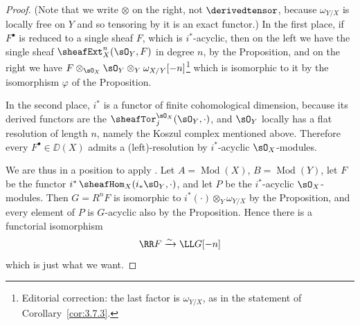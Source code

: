 \begin{proof}
(Note that we write $\otimes$ on the right, not $\derivedtensor$, because $\omega_{Y/X}$ is locally free on $Y$ and so tensoring by it is an exact functor.) In the first place, if $F^\bullet$ is reduced to a single sheaf $F$, which is $i^*$-acyclic, then on the left we have the single sheaf $\sheafExt_X^n(\sO_Y,F)$ in degree $n$, by the Proposition, and on the right we have $F\otimes_{\sO_X}\sO_Y\otimes_Y\omega_{X/Y}[-n]$\footnote{Editorial correction: the last factor is $\omega_{Y/X}$, as in the statement of Corollary~\ref{cor:3.7.3}.} which is isomorphic to it by the isomorphism $\varphi$ of the Proposition.

In the second place, $i^*$ is a functor of finite cohomological dimension, because its derived functors are the $\sheafTor_j^{\sO_X}(\sO_Y,\cdot)$, and $\sO_Y$ locally has a flat resolution of length $n$, namely the Koszul complex mentioned above. Therefore every $F^\bullet\in\DD(X)$ admits a (left)-resolution by $i^*$-acyclic $\sO_X$-modules.

We are thus in a position to apply . Let $A=\operatorname{Mod}(X)$, $B=\operatorname{Mod}(Y)$, let $F$ be the functor $i^*\,\sheafHom_X(i_*\sO_Y,\cdot)$, and let $P$ be the $i^*$-acyclic $\sO_X$-modules. Then $G=R^nF$ is isomorphic to $i^*(\cdot)\otimes_Y\omega_{Y/X}$ by the Proposition, and every element of $P$ is $G$-acyclic also by the Proposition. Hence there is a functorial isomorphism
\[
\RR F \xrightarrow{\sim} \LL G[-n]
\]
which is just what we want.
\end{proof}

